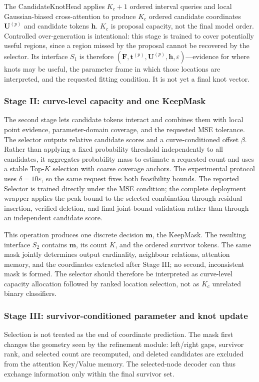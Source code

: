 \documentclass[preprint,12pt]{elsarticle}
\begin{document}
The CandidateKnotHead applies $K_c+1$ ordered interval queries and local
Gaussian-biased cross-attention to produce $K_c$ ordered candidate coordinates
$\bm U^{(p)}$ and candidate tokens $\bm h$. $K_c$ is proposal capacity, not the
final model order. Controlled over-generation is intentional: this stage is
trained to cover potentially useful regions, since a region missed by the
proposal cannot be recovered by the selector. Its interface $S_1$ is therefore
$(\bm F,\bm t^{(p)},\bm U^{(p)},\bm h,\varepsilon)$---evidence for where knots
may be useful, the parameter frame in which those locations are interpreted,
and the requested fitting condition. It is not yet a final knot vector.

\subsubsection{Stage II: curve-level capacity and one KeepMask}
The second stage lets candidate tokens interact and combines them with local
point evidence, parameter-domain coverage, and the requested MSE tolerance.
The selector outputs relative candidate scores and a curve-conditioned offset
$\beta$. Rather than applying a fixed probability threshold independently to
all candidates, it aggregates probability mass to estimate a requested count
and uses a stable Top-$K$ selection with coarse coverage anchors. The
experimental protocol uses $\delta=10\varepsilon$, so the same request fixes
both feasibility bounds. The reported Selector is trained directly under the
MSE condition; the complete deployment wrapper applies the peak bound to the
selected combination through residual insertion, verified deletion, and final
joint-bound validation rather than through an independent candidate score.

This operation produces one discrete decision $\bm m$, the KeepMask. The
resulting interface $S_2$ contains $\bm m$, its count $K$, and the ordered
survivor tokens. The same mask jointly determines output cardinality,
neighbour relations, attention memory, and the coordinates extracted after
Stage III; no second, inconsistent mask is formed. The selector should
therefore be interpreted as curve-level capacity allocation followed by
ranked location selection, not as $K_c$ unrelated binary classifiers.

\subsubsection{Stage III: survivor-conditioned parameter and knot update}
Selection is not treated as the end of coordinate prediction. The mask first
changes the geometry seen by the refinement module: left/right gaps, survivor
rank, and selected count are recomputed, and deleted candidates are excluded
from the attention Key/Value memory. The selected-node decoder can thus
exchange information only within the final survivor set.
\end{document}
